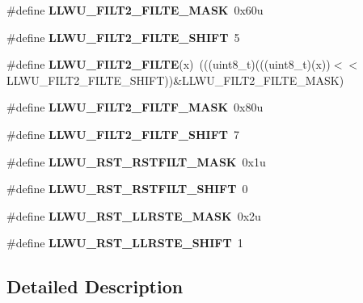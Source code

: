 \begin{DoxyCompactItemize}
\item 
\#define {\bfseries L\+L\+W\+U\+\_\+\+F\+I\+L\+T2\+\_\+\+F\+I\+L\+T\+E\+\_\+\+M\+A\+SK}~0x60u\hypertarget{group__LLWU__Register__Masks_ga6c6d4145e30bdb324bc6b137b2f7aada}{}\label{group__LLWU__Register__Masks_ga6c6d4145e30bdb324bc6b137b2f7aada}

\item 
\#define {\bfseries L\+L\+W\+U\+\_\+\+F\+I\+L\+T2\+\_\+\+F\+I\+L\+T\+E\+\_\+\+S\+H\+I\+FT}~5\hypertarget{group__LLWU__Register__Masks_gac309ec1ef795572d048b09ac35847bf1}{}\label{group__LLWU__Register__Masks_gac309ec1ef795572d048b09ac35847bf1}

\item 
\#define {\bfseries L\+L\+W\+U\+\_\+\+F\+I\+L\+T2\+\_\+\+F\+I\+L\+TE}(x)~(((uint8\+\_\+t)(((uint8\+\_\+t)(x))$<$$<$L\+L\+W\+U\+\_\+\+F\+I\+L\+T2\+\_\+\+F\+I\+L\+T\+E\+\_\+\+S\+H\+I\+FT))\&L\+L\+W\+U\+\_\+\+F\+I\+L\+T2\+\_\+\+F\+I\+L\+T\+E\+\_\+\+M\+A\+SK)\hypertarget{group__LLWU__Register__Masks_ga3c7ed2286e6f1a0041610a9b7de636ef}{}\label{group__LLWU__Register__Masks_ga3c7ed2286e6f1a0041610a9b7de636ef}

\item 
\#define {\bfseries L\+L\+W\+U\+\_\+\+F\+I\+L\+T2\+\_\+\+F\+I\+L\+T\+F\+\_\+\+M\+A\+SK}~0x80u\hypertarget{group__LLWU__Register__Masks_gab60be1393d84433fe44d4b332a77537c}{}\label{group__LLWU__Register__Masks_gab60be1393d84433fe44d4b332a77537c}

\item 
\#define {\bfseries L\+L\+W\+U\+\_\+\+F\+I\+L\+T2\+\_\+\+F\+I\+L\+T\+F\+\_\+\+S\+H\+I\+FT}~7\hypertarget{group__LLWU__Register__Masks_ga20b3ccaef11cade3a0dc88b3a378b790}{}\label{group__LLWU__Register__Masks_ga20b3ccaef11cade3a0dc88b3a378b790}

\item 
\#define {\bfseries L\+L\+W\+U\+\_\+\+R\+S\+T\+\_\+\+R\+S\+T\+F\+I\+L\+T\+\_\+\+M\+A\+SK}~0x1u\hypertarget{group__LLWU__Register__Masks_ga6a909bf1d49bb4f85ad988396fe928f2}{}\label{group__LLWU__Register__Masks_ga6a909bf1d49bb4f85ad988396fe928f2}

\item 
\#define {\bfseries L\+L\+W\+U\+\_\+\+R\+S\+T\+\_\+\+R\+S\+T\+F\+I\+L\+T\+\_\+\+S\+H\+I\+FT}~0\hypertarget{group__LLWU__Register__Masks_gaaa76fead204f735855760c2f071ac11f}{}\label{group__LLWU__Register__Masks_gaaa76fead204f735855760c2f071ac11f}

\item 
\#define {\bfseries L\+L\+W\+U\+\_\+\+R\+S\+T\+\_\+\+L\+L\+R\+S\+T\+E\+\_\+\+M\+A\+SK}~0x2u\hypertarget{group__LLWU__Register__Masks_ga9c57c7139b6659782c0a5e160b790c3e}{}\label{group__LLWU__Register__Masks_ga9c57c7139b6659782c0a5e160b790c3e}

\item 
\#define {\bfseries L\+L\+W\+U\+\_\+\+R\+S\+T\+\_\+\+L\+L\+R\+S\+T\+E\+\_\+\+S\+H\+I\+FT}~1\hypertarget{group__LLWU__Register__Masks_gaf1c8b75e71d3086612da4e1e2f768d72}{}\label{group__LLWU__Register__Masks_gaf1c8b75e71d3086612da4e1e2f768d72}

\end{DoxyCompactItemize}


\subsection{Detailed Description}
